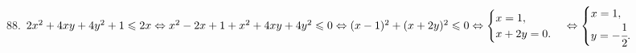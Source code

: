 88. $2x^2+4xy+4y^2+1\leqslant 2x\Leftrightarrow x^2-2x+1+x^2+4xy+4y^2\leqslant0
\Leftrightarrow (x-1)^2+(x+2y)^2\leqslant0 \Leftrightarrow \begin{cases} x=1,\\ x+2y=0.\end{cases} \Leftrightarrow \begin{cases} x=1,\\ y=-\cfrac{1}{2}.\end{cases}$\\

